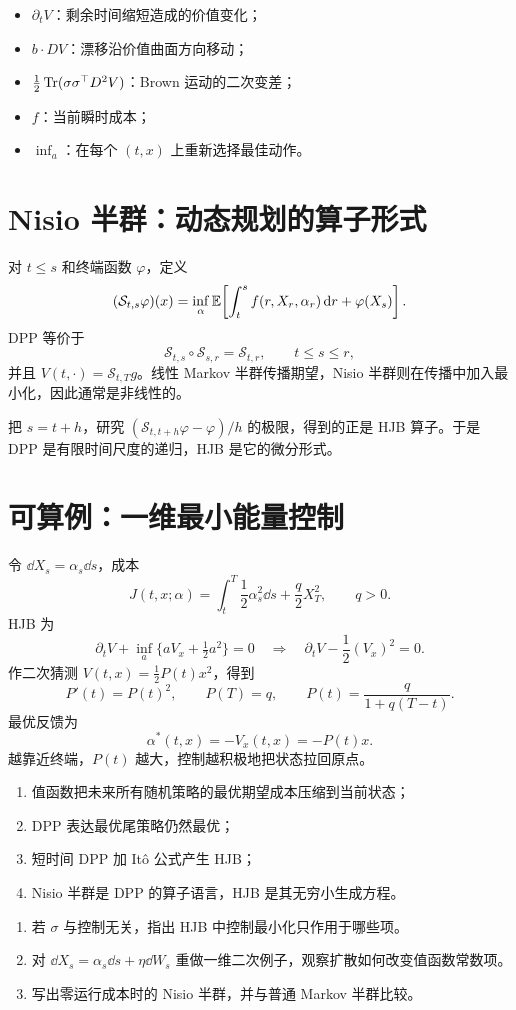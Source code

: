 \begin{derivation}[每一项来自哪里]
\begin{itemize}
  \item $\partial_tV$：剩余时间缩短造成的价值变化；
  \item $b\cdot DV$：漂移沿价值曲面方向移动；
  \item $\tfrac12\operatorname{Tr}(\sigma\sigma^\top D^2V)$：Brown 运动的二次变差；
  \item $f$：当前瞬时成本；
  \item $\inf_a$：在每个 $(t,x)$ 上重新选择最佳动作。
\end{itemize}
\end{derivation}

\section{Nisio 半群：动态规划的算子形式}

对 $t\le s$ 和终端函数 $\varphi$，定义
\[
(\mathcal S_{t,s}\varphi)(x)
=\inf_{\alpha}
\mathbb{E}\!\left[
\int_t^s f(r,X_r,\alpha_r)\,\mathrm{d} r+\varphi(X_s)
\right].
\]
DPP 等价于
\[
\mathcal S_{t,s}\circ\mathcal S_{s,r}
=\mathcal S_{t,r},\qquad t\le s\le r,
\]
并且 $V(t,\cdot)=\mathcal S_{t,T}g$。线性 Markov 半群传播期望，Nisio 半群则在传播中加入最小化，因此通常是非线性的。

\begin{intuition}
把 $s=t+h$，研究 $(\mathcal S_{t,t+h}\varphi-\varphi)/h$ 的极限，得到的正是 HJB 算子。于是 DPP 是有限时间尺度的递归，HJB 是它的微分形式。
\end{intuition}

\section{可算例：一维最小能量控制}

令 $\dd X_s=\alpha_s\dd s$，成本
\[
J(t,x;\alpha)=\int_t^T\frac12\alpha_s^2\dd s+\frac q2X_T^2,
\qquad q>0.
\]
HJB 为
\[
\partial_tV+\inf_a\{aV_x+\tfrac12a^2\}=0
\quad\Longrightarrow\quad
\partial_tV-\frac12(V_x)^2=0.
\]
作二次猜测 $V(t,x)=\tfrac12P(t)x^2$，得到
\[
P'(t)=P(t)^2,\qquad P(T)=q,
\qquad
P(t)=\frac{q}{1+q(T-t)}.
\]
最优反馈为
\[
\alpha^*(t,x)=-V_x(t,x)=-P(t)x.
\]
越靠近终端，$P(t)$ 越大，控制越积极地把状态拉回原点。

\begin{takeaway}
\begin{enumerate}
  \item 值函数把未来所有随机策略的最优期望成本压缩到当前状态；
  \item DPP 表达最优尾策略仍然最优；
  \item 短时间 DPP 加 Itô 公式产生 HJB；
  \item Nisio 半群是 DPP 的算子语言，HJB 是其无穷小生成方程。
\end{enumerate}
\end{takeaway}

\begin{exercisebox}
\begin{enumerate}
  \item 若 $\sigma$ 与控制无关，指出 HJB 中控制最小化只作用于哪些项。
  \item 对 $\dd X_s=\alpha_s\dd s+\eta\dd W_s$ 重做一维二次例子，观察扩散如何改变值函数常数项。
  \item 写出零运行成本时的 Nisio 半群，并与普通 Markov 半群比较。
\end{enumerate}
\end{exercisebox}
